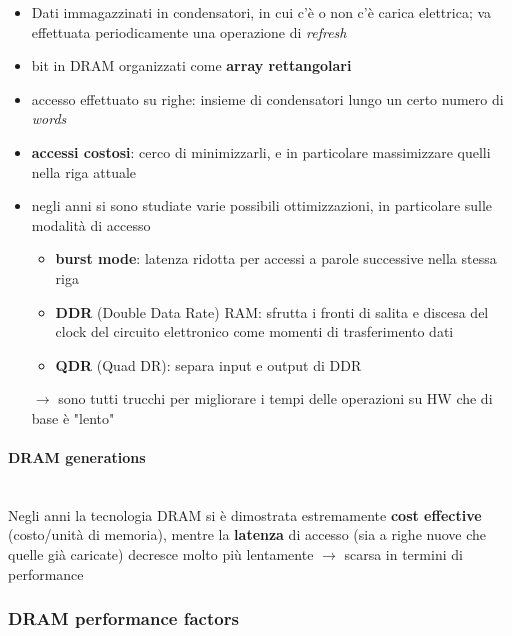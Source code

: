 \begin{itemize}
  \item Dati immagazzinati in condensatori, in cui c'\`e o non c'\`e carica elettrica; va effettuata periodicamente una operazione di \textit{refresh}
  \item bit in DRAM organizzati come \textbf{array rettangolari}
  \item accesso effettuato su righe: insieme di condensatori lungo un certo numero di \textit{words}
  \item \textbf{accessi costosi}: cerco di minimizzarli, e in particolare massimizzare quelli nella riga attuale 
  \item negli anni si sono studiate varie possibili ottimizzazioni, in particolare sulle modalit\`a di accesso
    \begin{itemize}
      \item \textbf{burst mode}: latenza ridotta per accessi a parole successive nella stessa riga
      \item \textbf{DDR} (Double Data Rate) RAM: sfrutta i fronti di salita e discesa del clock del circuito elettronico come momenti di trasferimento dati
      \item \textbf{QDR} (Quad DR): separa input e output di DDR
    \end{itemize}

  \item[$\rightarrow$] sono tutti trucchi per migliorare i tempi delle operazioni su HW che di base \`e "lento"
\end{itemize}

\paragraph{DRAM generations}~\\

Negli anni la tecnologia DRAM si \`e dimostrata estremamente \textbf{cost effective} (costo/unit\`a di memoria), mentre la \textbf{latenza} di accesso (sia a righe nuove che quelle gi\`a caricate) decresce molto pi\`u lentamente $\rightarrow$ scarsa in termini di performance

\subsubsection{DRAM performance factors}

